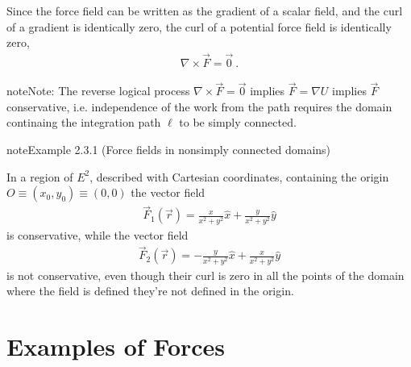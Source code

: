 \documentclass[letterpaper,10pt,english]{jupyterBook}
\begin{document}
\sphinxAtStartPar
Since the force field can be written as the gradient of a scalar field, and the curl of a gradient is identically zero, the curl of a potential force field is identically zero,
\begin{equation*}
\begin{split}\nabla \times \vec{F} = \vec{0} \ .\end{split}
\end{equation*}
\begin{sphinxadmonition}{note}{Note:}
\sphinxAtStartPar
The reverse logical process \sphinxhyphen{} \(\nabla \times \vec{F} = \vec{0}\) implies \(\vec{F} = \nabla U\) implies \(\vec{F}\) conservative, i.e. independence of the work from the path \sphinxhyphen{} requires the domain continaing the integration path \(\ell\) to be simply connected.
\end{sphinxadmonition}
\label{ch/actions-conservative:example-0}
\begin{sphinxadmonition}{note}{Example 2.3.1 (Force fields in non\sphinxhyphen{}simply connected domains)}



\sphinxAtStartPar
In a region of \(E^2\), described with Cartesian coordinates, containing the origin \(O \equiv (x_0, y_0) \equiv (0,0)\) the vector field
\begin{equation*}
\begin{split}\vec{F}_1(\vec{r}) = \frac{x}{x^2 + y^2} \hat{x} + \frac{y}{x^2+y^2} \hat{y}\end{split}
\end{equation*}
\sphinxAtStartPar
is conservative, while the vector field
\begin{equation*}
\begin{split}\vec{F}_2(\vec{r}) = -\frac{y}{x^2 + y^2} \hat{x} + \frac{x}{x^2+y^2} \hat{y}\end{split}
\end{equation*}
\sphinxAtStartPar
is not conservative, even though their curl is zero in all the points of the domain where the field is defined \sphinxhyphen{} they’re not defined in the origin.
\end{sphinxadmonition}

\sphinxstepscope


\section{Examples of Forces}
\label{\detokenize{ch/actions-examples:examples-of-forces}}\label{\detokenize{ch/actions-examples:classical-mechanics-actions-examples}}\label{\detokenize{ch/actions-examples::doc}}
\end{document}
